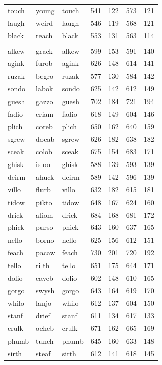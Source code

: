 \documentclass[
]{interact}
\begin{document}
\begin{longtable*}{lllrrrr}
touch & young & touch & 541 & 122 & 573 & 121 \\ 
laugh & weird & laugh & 546 & 119 & 568 & 121 \\ 
black & reach & black & 553 & 131 & 563 & 114 \\ 
\midrule\addlinespace[2.5pt]
 \\ 
\midrule\addlinespace[2.5pt]
alkew & grack & alkew & 599 & 153 & 591 & 140 \\ 
agink & furob & agink & 626 & 148 & 614 & 141 \\ 
ruzak & begro & ruzak & 577 & 130 & 584 & 142 \\ 
sondo & labok & sondo & 625 & 142 & 612 & 149 \\ 
guesh & gazzo & guesh & 702 & 184 & 721 & 194 \\ 
fadio & criam & fadio & 618 & 149 & 604 & 146 \\ 
plich & coreb & plich & 650 & 162 & 640 & 159 \\ 
sgrew & docab & sgrew & 626 & 182 & 638 & 182 \\ 
sceak & colob & sceak & 675 & 154 & 683 & 171 \\ 
ghisk & isloo & ghisk & 588 & 139 & 593 & 139 \\ 
deirm & ahuck & deirm & 589 & 142 & 596 & 139 \\ 
villo & flurb & villo & 632 & 182 & 615 & 181 \\ 
tidow & pikto & tidow & 648 & 167 & 624 & 160 \\ 
drick & aliom & drick & 684 & 168 & 681 & 172 \\ 
phick & purso & phick & 643 & 160 & 637 & 165 \\ 
nello & borno & nello & 625 & 156 & 612 & 151 \\ 
feach & pacaw & feach & 730 & 201 & 720 & 192 \\ 
tello & rilth & tello & 651 & 175 & 644 & 171 \\ 
dolio & caveb & dolio & 602 & 148 & 610 & 165 \\ 
gorgo & swysh & gorgo & 643 & 164 & 619 & 170 \\ 
whilo & lanjo & whilo & 612 & 137 & 604 & 150 \\ 
stanf & drief & stanf & 611 & 134 & 617 & 133 \\ 
crulk & ocheb & crulk & 671 & 162 & 665 & 169 \\ 
phumb & tunch & phumb & 645 & 160 & 633 & 148 \\ 
sirth & steaf & sirth & 612 & 141 & 618 & 145 \\ 

\end{longtable*}
\end{document}
